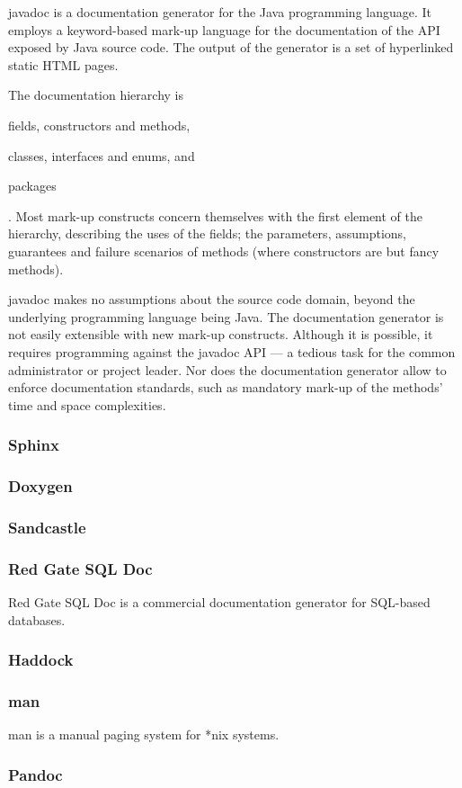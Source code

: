 javadoc is a documentation generator for the
Java\textsuperscript{\texttrademark} programming language. It employs a
keyword-based mark-up language for the documentation of the API exposed by Java
source code. The output of the generator is a set of hyperlinked static HTML
pages.

The documentation hierarchy is \begin{inparaenum}[(1)] \item fields,
constructors and methods, \item classes, interfaces and enums, and \item
packages\end{inparaenum}. Most mark-up constructs concern themselves with the
first element of the hierarchy, describing the uses of the fields; the
parameters, assumptions, guarantees and failure scenarios of methods (where
constructors are but fancy methods).

javadoc makes no assumptions about the source code domain, beyond the
underlying programming language being Java. The documentation generator is not
easily extensible with new mark-up constructs. Although it is possible, it
requires programming against the javadoc API --- a tedious task for the common
administrator or project leader. Nor does the documentation generator allow to
enforce documentation standards, such as mandatory mark-up of the methods' time
and space complexities.

\subsubsection{Sphinx}

\subsubsection{Doxygen}

\subsubsection{Sandcastle}

\subsubsection{Red Gate SQL Doc}

Red Gate SQL Doc is a commercial documentation generator for SQL-based databases. 

\subsubsection{Haddock}

\subsubsection{man}

man is a manual paging system for *nix systems.

\subsubsection{Pandoc}
